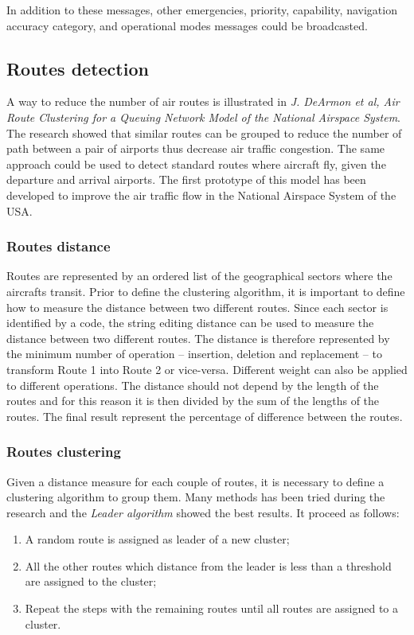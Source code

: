 \documentclass{vldb}
\begin{document}
    In addition to these messages, other emergencies, priority, capability, navigation accuracy category, and operational modes messages could be broadcasted.

\subsection{Routes detection}

A way to reduce the number of air routes is illustrated in \textit{J. DeArmon et al, Air Route Clustering for a Queuing Network Model of the National Airspace System}. The research showed that similar routes can be grouped to reduce the number of path between a pair of airports thus decrease air traffic congestion. The same approach could be used to detect standard routes where aircraft fly, given the departure and arrival airports. The first prototype of this model has been developed to improve the air traffic flow in the National Airspace System of the USA.

    \subsubsection{Routes distance}

    Routes are represented by an ordered list of the geographical sectors where the aircrafts transit. Prior to define the clustering algorithm, it is important to define how to measure the distance between two different routes. Since each sector is identified by a code, the string editing distance can be used to measure the distance between two different routes. The distance is therefore represented by the minimum number of operation -- insertion, deletion and replacement -- to transform Route 1 into Route 2 or vice-versa. Different weight can also be applied to different operations. The distance should not depend by the length of the routes and for this reason it is then divided by the sum of the lengths of the routes. The final result represent the percentage of difference between the routes.

    \subsubsection{Routes clustering}

    Given a distance measure for each couple of routes, it is necessary to define a clustering algorithm to group them. Many methods has been tried during the research and the \textit{Leader algorithm} showed the best results. It proceed as follows:
    \begin{enumerate}
      \item A random route is assigned as leader of a new cluster;
      \item All the other routes which distance from the leader is less than a threshold are assigned to the cluster;
      \item Repeat the steps with the remaining routes until all routes are assigned to a cluster.
    \end{enumerate}
\end{document}
